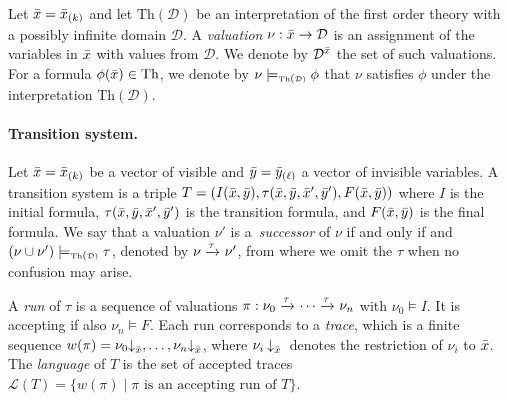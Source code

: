 \documentclass[10pt]{llncs}
\newcommand{\theo}{\mbox{Th}}
\newcommand{\thd}{\theo(\mathcal{D})}
\newcommand{\modelsthd}{\models_{\mbox{\tiny Th}(\scriptscriptstyle\mathcal{D})}}
\def\proj{\mathbin{\downarrow}}
\newcommand{\set}{\vect}
\newcommand{\arrow}[2]{\xrightarrow{{\scriptstyle #1}}_{{\scriptstyle #2}}}
\newcommand{\domain}{\mathcal {D}}
\newcommand{\lang}{\mathcal {L}}
\newcommand{\Xobs}{\vect{x}}
\newcommand{\Xinv}{\vect{y}}
\newcommand{\initial}{I}
\newcommand{\accepting}{F}
\newcommand{\transition}{\tau}
\begin{document}
Let $\vect{x} = \vect{x}[k]$ and
%
let $\thd$ be an interpretation of the first order theory with a possibly infinite domain $\domain$. 
%
A \emph{valuation} $\nu : \set{x} \rightarrow \domain$ is an
assignment of the variables in $\vect{x}$ with values from
$\domain$. We denote by $\domain^{\set{x}}$ the set of such
valuations. 
%
For a formula $\phi(\vect{x})\in\theo$, we denote by $\nu
\modelsthd \phi$ that $\nu$ satisfies $\phi$ under the interpretation $\thd$. 
%
%
%
%

\paragraph{Transition system.} 
%
Let $\vect{x} = \vect{x}[k]$ be a vector of visible and $\vect{y}=\vect{y}[\ell]$ a vector of invisible variables.
%
A transition system is a triple $T = (\initial(\Xobs,\Xinv),\transition(\Xobs,\Xinv,\Xobs', \Xinv'),\accepting(\Xobs,\Xinv))$ where $\initial$ is the initial formula, 
$\transition(\Xobs,\Xinv,\Xobs', \Xinv')$ is the transition formula, 
and $\accepting(\Xobs,\Xinv)$ is the final formula.
%
We say that a valuation $\nu'$ is 
a~\emph{successor} of $\nu$ if and only if and $(\nu\cup\nu') \modelsthd
\transition$, denoted by $\nu
\arrow{\transition}{} \nu'$, from where we omit the $\transition$ 
when no confusion may arise. 


A \emph{run} of $\transition$ is a sequence
of valuations $\pi : \nu_0 \arrow{\transition}{}  \cdots \arrow{\transition}{} \nu_n$ with $\nu_0\models\initial$. 
It is accepting if also $\nu_n\models\accepting$.
Each run corresponds to a \emph{trace}, which is a finite sequence
$w(\pi)=\nu_0\proj_{\Xobs}, \ldots,
\nu_n\proj_{\Xobs}$, where $\nu_i\proj_{\Xobs}{}$ denotes the restriction of $\nu_i$ to $\Xobs$.
%
The \emph{language} of $T$ is the set of accepted traces 
$\lang(T) = \{w(\pi)\mid \pi \text{ is an accepting run of } T\}$.
\end{document}
